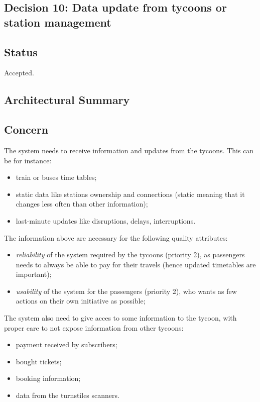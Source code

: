 \subsection{Decision 10: Data update from tycoons or station management}

\subsection*{Status}
Accepted.
\subsection*{Architectural Summary}


\subsection*{Concern}
The system needs to receive information and updates from the tycoons. 
This can be for instance:
\begin{itemize}
    \item train or buses time tables;
    \item static data like stations ownership and connections (static meaning that it changes less often than other information);
    \item last-minute updates like disruptions, delays, interruptions.
\end{itemize}
The information above are necessary for the following quality attributes:
\begin{itemize}
    \item \textit{reliability} of the system required by the tycoons (priority 2), as passengers needs to always be able to pay for their travels (hence updated timetables are important);
    \item \textit{usability} of the system for the passengers (priority 2), who wants as few actions on their own initiative as possible;
\end{itemize}

The system also need to give acces to some information to the tycoon, with proper care to not expose information from other tycoons:
\begin{itemize}
    \item payment received by subscribers;
    \item bought tickets;
    \item booking information;
    \item data from the turnstiles scanners. 
\end{itemize}

